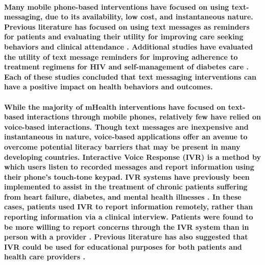 \paragraph{Many mobile phone-based interventions have focused on using text-messaging, due to its availability, low cost, and instantaneous nature.  Previous literature has focused on using text messages as reminders for patients and evaluating their utility for improving care seeking behaviors \citep{ColeLewis2010} and clinical attendance \citep{Guy2012}. Additional studies have evaluated the utility of text message reminders for improving adherence to treatment regimens for HIV \citep{Horvath2012} and self-management of diabetes care \citep{Krishna2008}. Each of these studies concluded that text messaging interventions can have a positive impact on health behaviors and outcomes.}

\paragraph{While the majority of mHealth interventions have focused on text-based interactions through mobile phones, relatively few have relied on voice-based interactions. Though text messages are inexpensive and instantaneous in nature, voice-based applications offer an avenue to overcome potential literacy barriers that may be present in many developing countries. Interactive Voice Response (IVR) is a method by which users listen to recorded messages and report information using their phone's touch-tone keypad. IVR systems have  previously been implemented to assist in the treatment of chronic patients suffering from heart failure, diabetes, and mental health illnesses \citep{Piette2000}. In these cases, patients used IVR to report information remotely, rather than reporting information via a clinical interview. Patients were found to be more willing to report concerns through the IVR system than in person with a provider \citep{Piette2000}. Previous literature has also suggested that IVR could be used for educational purposes for both patients and health care providers \citep{Labrique2013, Lee2003}.}

